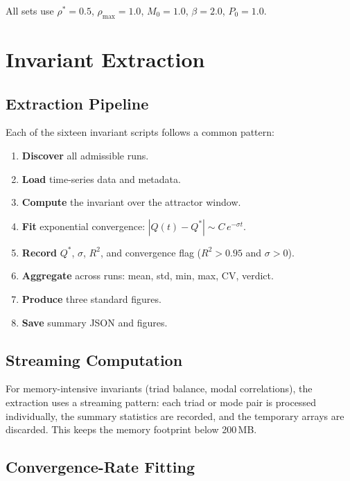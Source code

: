 \documentclass[11pt,twoside,openright]{book}
\theoremstyle{definition}
\theoremstyle{plain}
\theoremstyle{definition}
\theoremstyle{remark}
\newcommand{\rhomax}{\rho_{\max}}
\newcommand{\rhostar}{\rho^{*}}
\begin{document}
All sets use \(\rhostar = 0.5\), \(\rhomax = 1.0\), \(M_0 = 1.0\), \(\beta = 2.0\), \(P_0 = 1.0\).


\chapter{Invariant Extraction}\label{ch:extraction}

\section{Extraction Pipeline}

Each of the sixteen invariant scripts follows a common pattern:
\begin{enumerate}
\item \textbf{Discover} all admissible runs.
\item \textbf{Load} time-series data and metadata.
\item \textbf{Compute} the invariant over the attractor window.
\item \textbf{Fit} exponential convergence: \(|Q(t) - Q^*| \sim C\,e^{-\sigma t}\).
\item \textbf{Record} \(Q^*\), \(\sigma\), \(R^2\), and convergence flag (\(R^2 > 0.95\) and \(\sigma > 0\)).
\item \textbf{Aggregate} across runs: mean, std, min, max, CV, verdict.
\item \textbf{Produce} three standard figures.
\item \textbf{Save} summary JSON and figures.
\end{enumerate}

\section{Streaming Computation}

For memory-intensive invariants (triad balance, modal correlations), the extraction uses a streaming pattern: each triad or mode pair is processed individually, the summary statistics are recorded, and the temporary arrays are discarded. This keeps the memory footprint below 200\,MB.

\section{Convergence-Rate Fitting}
\end{document}
